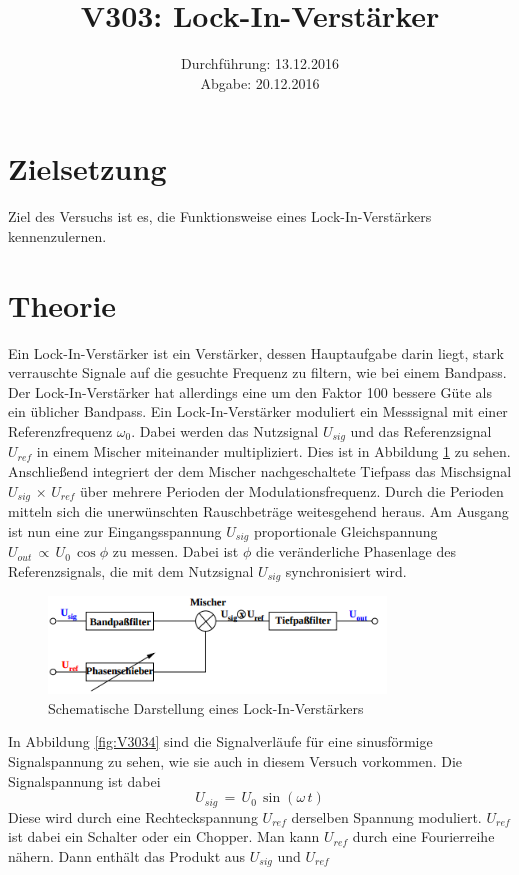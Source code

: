 \documentclass[
  bibliography=totoc,     %
  captions=tableheading,  %
  titlepage=firstiscover, %
]{scrartcl}
\title{V303: Lock-In-Verstärker}
\author{
  Simon Schulte
  \texorpdfstring{
    \\
    \href{mailto:simon.schulte@udo.edu}{simon.schulte@udo.edu}
  }{}
  \texorpdfstring{\and}{, }
  Tim Sedlaczek
  \texorpdfstring{
    \\
    \href{mailto:tim.sedlaczek@udo.edu}{tim.sedlaczek@udo.edu}
  }{}
}
\date{Durchführung: 13.12.2016\\
      Abgabe: 20.12.2016}
\begin{document}
\maketitle
\thispagestyle{empty}
\tableofcontents
\newpage
\section{Zielsetzung}
\label{sec:zielsetzung}
Ziel des Versuchs ist es, die Funktionsweise eines Lock-In-Verstärkers
kennenzulernen.
\section{Theorie}
\label{sec:theorie}
Ein Lock-In-Verstärker ist ein Verstärker, dessen Hauptaufgabe darin liegt,
stark verrauschte Signale auf die gesuchte Frequenz zu filtern, wie bei einem
Bandpass. Der Lock-In-Verstärker hat allerdings eine um den Faktor 100 bessere
Güte als ein üblicher Bandpass.
Ein Lock-In-Verstärker moduliert ein Messsignal mit einer Referenzfrequenz
$\omega_0$. Dabei werden das Nutzsignal $U_{sig}$ und das Referenzsignal
$U_{ref}$ in einem Mischer miteinander multipliziert. Dies ist in Abbildung
\ref{fig:V3033} zu sehen. Anschließend integriert der dem Mischer nachgeschaltete
Tiefpass das Mischsignal $U_{sig}\,\times\,U_{ref}$ über mehrere Perioden der
Modulationsfrequenz. Durch die Perioden mitteln sich die unerwünschten
Rauschbeträge weitesgehend heraus. Am Ausgang ist nun eine zur Eingangsspannung
$U_{sig}$ proportionale Gleichspannung $U_{out}\,\propto\,U_0\,\cos\phi$ zu
messen. Dabei ist $\phi$ die veränderliche Phasenlage des Referenzsignals, die
mit dem Nutzsignal $U_{sig}$ synchronisiert wird.
\begin{figure}[htb]
  \centering
  \includegraphics[width=0.8\textwidth]{V3033.png}
  \caption{Schematische Darstellung eines Lock-In-Verstärkers}
  \label{fig:V3033}
\end{figure}
\newpage
In Abbildung \ref{fig:V3034} sind die Signalverläufe für eine sinusförmige
Signalspannung zu sehen, wie sie auch in diesem Versuch vorkommen. Die
Signalspannung ist dabei
\begin{equation}
  U_{sig}\,=\,U_0\,\sin({\omega\,t})
\end{equation}
\label{eqn:1}
Diese wird durch eine Rechteckspannung $U_{ref}$ derselben Spannung moduliert.
$U_{ref}$ ist dabei ein Schalter oder ein Chopper. Man kann $U_{ref}$ durch
eine Fourierreihe nähern. Dann enthält das Produkt aus $U_{sig}$ und $U_{ref}$
\end{document}
